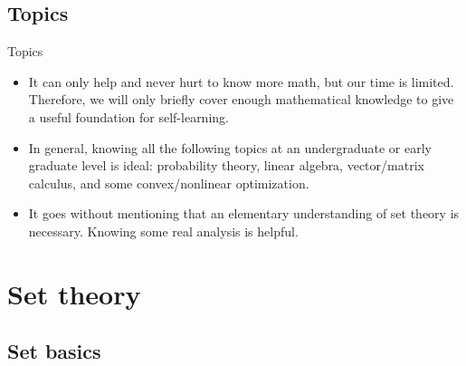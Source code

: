 \documentclass{beamer}
\numberwithin{equation}{section}
\begin{document}
\subsection{Topics}

\begin{frame}{Topics}
    \begin{itemize}
        \item
        It can only help and never hurt to know more
        math\footnotemark{}, but our time is
        limited. Therefore, we will only briefly cover enough mathematical
        knowledge to give a useful foundation for self-learning.

        \item
        In general, knowing all the following topics at an undergraduate or
        early graduate level is ideal: probability theory, linear algebra,
        vector/matrix calculus, and some convex/nonlinear optimization.

        \item
        It goes without mentioning that an elementary understanding of set
        theory is necessary. Knowing some real analysis is helpful.
    \end{itemize}
\end{frame}

\section{Set theory}

\subsection{Set basics}
\end{document}

